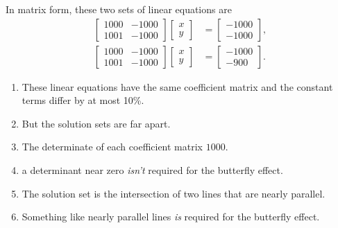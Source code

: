\documentclass[usenames,dvipsnames,fleqn]{beamer}
\theoremstyle{definition}
\begin{document}
\begin{frame}
In matrix form, these two sets of linear equations are
\begin{align*}
 \begin{bmatrix} 1000& -1000 \\ 1001 & -1000 \end{bmatrix} \begin{bmatrix} x \\ y \end{bmatrix} &= 
     \begin{bmatrix} -1000 \\ -1000 \end{bmatrix}, \\
 \begin{bmatrix} 1000 & -1000 \\ 1001 & -1000 \end{bmatrix} \begin{bmatrix} x \\ y \end{bmatrix} &= 
     \begin{bmatrix} -1000 \\ -900 \end{bmatrix}.   
\end{align*}

\begin{enumerate}

\item These linear equations have the same coefficient matrix and the constant terms differ by at most 10\%.

\item But the solution sets are far apart. 

\item The determinate of each coefficient matrix \(1000\).

\item a  determinant near zero \emph{isn't} required for the butterfly effect.

\item The solution set is the intersection of two lines that are nearly parallel.

\item Something like nearly parallel lines \emph{is }  required for the butterfly effect.

\end{enumerate}
\end{frame}
\end{document}
